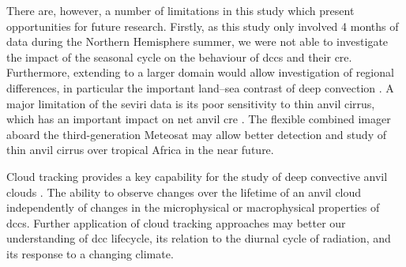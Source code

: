 There are, however, a number of limitations in this study which present opportunities for future research. 
Firstly, as this study only involved 4 months of data during the Northern Hemisphere summer, we were not able to investigate the impact of the seasonal cycle on the behaviour of \acrshort{dcc}s and their \acrshort{cre}. 
Furthermore, extending to a larger domain would allow investigation of regional differences, in particular the important land--sea contrast of deep convection \citep{takahashi_revisiting_2023}. 
A major limitation of the \acrshort{seviri} data is its poor sensitivity to thin anvil cirrus, which has an important impact on net anvil \acrshort{cre} \citep{protopapadaki_upper_2017, horner_evolution_2022}.
The flexible combined imager \citep{martin_fci_2021} aboard the third-generation Meteosat may allow better detection and study of thin anvil cirrus over tropical Africa in the near future.

Cloud tracking provides a key capability for the study of deep convective anvil clouds \citep{gasparini_opinion_2023}.
The ability to observe changes over the lifetime of an anvil cloud independently of changes in the microphysical or macrophysical properties of \acrshort{dcc}s.
Further application of cloud tracking approaches may better our understanding of \acrshort{dcc} lifecycle, its relation to the diurnal cycle of radiation, and its response to a changing climate.



